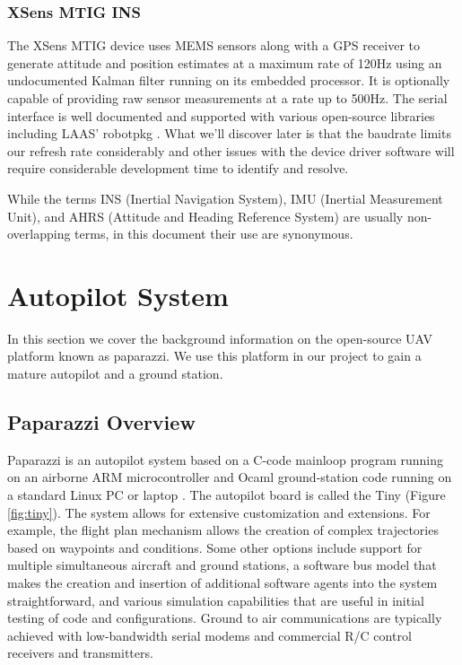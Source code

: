 \documentclass[a4paper,11pt]{report}
\begin{document}
\subsubsection{XSens MTIG INS}
\label{MTIG}

The XSens MTIG device uses MEMS sensors along with a GPS receiver to generate attitude and position estimates at a maximum rate of 120Hz using an undocumented Kalman filter running on its embedded processor. It is optionally capable of providing raw sensor measurements at a rate up to 500Hz. The serial interface is well documented and supported with various open-source libraries including LAAS' robotpkg \cite{robotpkg}. What we'll discover later is that the baudrate limits our refresh rate considerably and other issues with the device driver software will require considerable development time to identify and resolve.

While the terms INS (Inertial Navigation System), IMU (Inertial Measurement Unit), and AHRS (Attitude and Heading Reference System) are usually non-overlapping terms, in this document their use are synonymous.

\section{Autopilot System}
\label{sec:paparazzi}

In this section we cover the background information on the open-source UAV platform known as paparazzi. We use this platform in our project to gain a mature autopilot and a ground station.

\subsection{Paparazzi Overview}

Paparazzi is an autopilot system based on a C-code mainloop program running on an airborne ARM microcontroller and Ocaml ground-station code running on a standard Linux PC or laptop \cite{paparazzi}. The autopilot board is called the Tiny (Figure \ref{fig:tiny}). The system allows for extensive customization and extensions. For example, the flight plan mechanism allows the creation of complex trajectories based on waypoints and conditions. Some other options include support for multiple simultaneous aircraft and ground stations,  a software bus model that makes the creation and insertion of additional software agents into the system straightforward, and various simulation capabilities that are useful in initial testing of code and configurations. Ground to air communications are typically achieved with low-bandwidth serial modems and commercial R/C control receivers and transmitters. 
\end{document}
